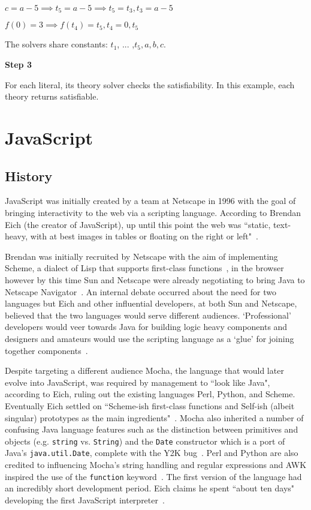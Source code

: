 \documentclass[]{final_report}
\begin{document}
$c = a - 5 \implies t_5 = a - 5 \implies t_5 = t_3, t_3 = a- 5$

$f(0) =3 \implies f(t_4) = t_5, t_4 = 0, t_5$

The solvers share constants: $t_1$, ... ,$t_5, a, b, c$.

\textbf{Step 3}

For each literal, its theory solver checks the satisfiability. In this example, each theory returns satisfiable.

\chapter{JavaScript}

\section{History}

JavaScript was initially created by a team at Netscape in 1996 with the goal of bringing interactivity to the web via a scripting language. According to Brendan Eich (the creator of JavaScript), up until this point the web was ``static, text-heavy, with at best images in tables or floating on the right or left"~\cite{AZProgrammingLanguages}. 

Brendan was initially recruited by Netscape with the aim of implementing Scheme, a dialect of Lisp that supports first-class functions~\cite{dybvig1996scheme}, in the browser however by this time Sun and Netscape were already negotiating to bring Java to Netscape Navigator~\cite{popularityofjavascript}. An internal debate occurred about the need for two languages but Eich and other influential developers, at both Sun and Netscape, believed that the two languages would serve different audiences. `Professional' developers would veer towards Java for building logic heavy components and designers and amateurs would use the scripting language as a `glue' for joining together components~\cite{AZProgrammingLanguages}.

Despite targeting a different audience Mocha, the language that would later evolve into JavaScript, was required by management to ``look like Java", according to Eich, ruling out the existing languages Perl, Python, and Scheme. Eventually Eich settled on ``Scheme-ish first-class functions and Self-ish (albeit singular) prototypes as the main ingredients"~\cite{popularityofjavascript}. Mocha also inherited a number of confusing Java language features such as the distinction between primitives and objects (e.g. \lstinline{string} vs. \lstinline{String}) and the \lstinline|Date| constructor which is a port of Java's \lstinline|java.util.Date|, complete with the Y2K bug~\cite{brendaneichtimetomakejscomment}. Perl and Python are also credited to influencing Mocha's string handling and regular expressions and AWK inspired the use of the \lstinline{function} keyword~\cite{briefhistoryofjavascript}. The first version of the language had an incredibly short development period. Eich claims he spent ``about ten days" developing the first JavaScript interpreter~\cite{AZProgrammingLanguages}.
\end{document}
